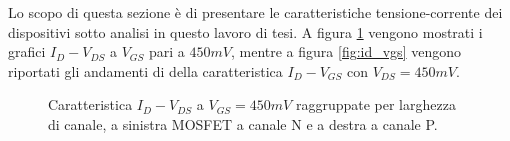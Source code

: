 Lo scopo di questa sezione è di presentare le caratteristiche tensione-corrente dei dispositivi sotto analisi in questo lavoro di tesi.
A figura \ref{fig:id_vds} vengono mostrati i grafici $I_{D} - V_{DS}$ a $V_{GS}$ pari a $450mV$, mentre a figura \ref{fig:id_vgs} vengono riportati gli andamenti di della caratteristica $I_D - V_{GS}$ con $V_{DS} = 450mV$.


\begin{figure}[p]
    \centering
  
    \caption[Caratteristica $I_D - V_{DS}$ NMOS e PMOS]{Caratteristica $I_D - V_{DS}$ a $V_{GS} = 450mV$ raggruppate per larghezza di canale, a sinistra MOSFET a canale N e a destra a canale P.}
    \label{fig:id_vds}
  \end{figure}



